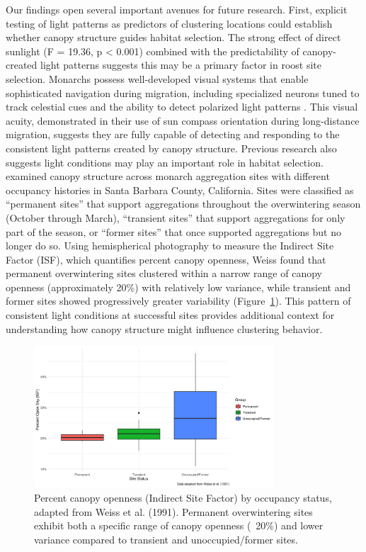 Our findings open several important avenues for future research. First, explicit testing of light patterns as predictors of clustering locations could establish whether canopy structure guides habitat selection. The strong effect of direct sunlight (F = 19.36, p < 0.001) combined with the predictability of canopy-created light patterns suggests this may be a primary factor in roost site selection. Monarchs possess well-developed visual systems that enable sophisticated navigation during migration, including specialized neurons tuned to track celestial cues and the ability to detect polarized light patterns \autocite{nguyenSunCompassNeurons2021,stalleickenMonarchButterfliesUse2005}. This visual acuity, demonstrated in their use of sun compass orientation during long-distance migration, suggests they are fully capable of detecting and responding to the consistent light patterns created by canopy structure. Previous research also suggests light conditions may play an important role in habitat selection. \autocite{weissForestCanopyStructure1991} examined canopy structure across monarch aggregation sites with different occupancy histories in Santa Barbara County, California. Sites were classified as ``permanent sites'' that support aggregations throughout the overwintering season (October through March), ``transient sites'' that support aggregations for only part of the season, or ``former sites'' that once supported aggregations but no longer do so. Using hemispherical photography to measure the Indirect Site Factor (ISF), which quantifies percent canopy openness, Weiss found that permanent overwintering sites clustered within a narrow range of canopy openness (approximately 20\%) with relatively low variance, while transient and former sites showed progressively greater variability (Figure~\ref{fig:weiss_canopy}). This pattern of consistent light conditions at successful sites provides additional context for understanding how canopy structure might influence clustering behavior.

\begin{figure}[h]
    \centering
    \includegraphics[width=0.8\textwidth]{figures/discussion/weiss_adapted_boxplot.png}
    \caption{Percent canopy openness (Indirect Site Factor) by occupancy status, adapted from Weiss et al. (1991). Permanent overwintering sites exhibit both a specific range of canopy openness (~20\%) and lower variance compared to transient and unoccupied/former sites.}
    \label{fig:weiss_canopy}
\end{figure}

